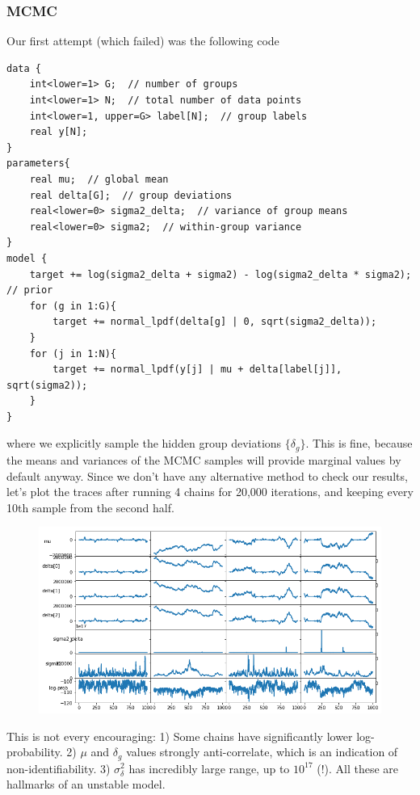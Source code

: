 \documentclass[10pt,oneside]{article}
\begin{document}
\subsubsection*{MCMC}
Our first attempt (which failed) was the following code
\begin{lstlisting}[language={}]
data {
    int<lower=1> G;  // number of groups
    int<lower=1> N;  // total number of data points
    int<lower=1, upper=G> label[N];  // group labels
    real y[N];
}
parameters{
    real mu;  // global mean
    real delta[G];  // group deviations
    real<lower=0> sigma2_delta;  // variance of group means
    real<lower=0> sigma2;  // within-group variance
}
model {
    target += log(sigma2_delta + sigma2) - log(sigma2_delta * sigma2); // prior
    for (g in 1:G){
        target += normal_lpdf(delta[g] | 0, sqrt(sigma2_delta));
    }
    for (j in 1:N){
        target += normal_lpdf(y[j] | mu + delta[label[j]], sqrt(sigma2));
    }
}
\end{lstlisting}
where we explicitly sample the hidden group deviations $\{\delta_g\}$. This is fine, because the means and variances of the MCMC samples will provide marginal values by default anyway. Since we don't have any alternative method to check our results, let's plot the traces after running 4 chains for 20,000 iterations, and keeping every 10th sample from the second half.
\begin{figure}[h]
\centering
\includegraphics[width=\textwidth]{P5-chains1.png}
\end{figure}

This is not every encouraging: 1) Some chains have significantly lower log-probability. 2) $\mu$ and $\delta_g$ values strongly anti-correlate, which is an indication of non-identifiability. 3) $\sigma_\delta^2$ has incredibly large range, up to $10^{17}$ (!). All these are hallmarks of an unstable model.
\end{document}
